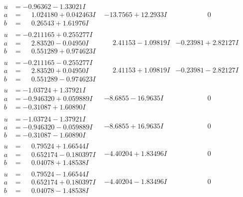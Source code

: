 \documentclass[1p]{elsarticle_modified}
\theoremstyle{definition}
\begin{document}
$$\begin{array}{c|c|c}
\begin{aligned}
u &= -0.96362 - 1.33021 I \\
a &= \phantom{-}1.024180 + 0.042463 I \\
b &= \phantom{-}0.26543 + 1.61976 I\end{aligned}
 & -13.7565 + 12.2933 I & \phantom{-0.000000 } 0 \\ \hline\begin{aligned}
u &= -0.211165 + 0.255277 I \\
a &= \phantom{-}2.83520 - 0.04950 I \\
b &= \phantom{-}0.551289 + 0.974623 I\end{aligned}
 & \phantom{-}2.41153 - 1.09819 I & -0.23981 + 2.82127 I \\ \hline\begin{aligned}
u &= -0.211165 - 0.255277 I \\
a &= \phantom{-}2.83520 + 0.04950 I \\
b &= \phantom{-}0.551289 - 0.974623 I\end{aligned}
 & \phantom{-}2.41153 + 1.09819 I & -0.23981 - 2.82127 I \\ \hline\begin{aligned}
u &= -1.03724 + 1.37921 I \\
a &= -0.946320 + 0.059889 I \\
b &= -0.31087 + 1.60890 I\end{aligned}
 & -8.6855 - 16.9635 I & \phantom{-0.000000 } 0 \\ \hline\begin{aligned}
u &= -1.03724 - 1.37921 I \\
a &= -0.946320 - 0.059889 I \\
b &= -0.31087 - 1.60890 I\end{aligned}
 & -8.6855 + 16.9635 I & \phantom{-0.000000 } 0 \\ \hline\begin{aligned}
u &= \phantom{-}0.79524 + 1.66544 I \\
a &= \phantom{-}0.652174 - 0.180397 I \\
b &= \phantom{-}0.04078 + 1.48538 I\end{aligned}
 & -4.40204 + 1.83496 I & \phantom{-0.000000 } 0 \\ \hline\begin{aligned}
u &= \phantom{-}0.79524 - 1.66544 I \\
a &= \phantom{-}0.652174 + 0.180397 I \\
b &= \phantom{-}0.04078 - 1.48538 I\end{aligned}
 & -4.40204 - 1.83496 I & \phantom{-0.000000 } 0 \\ \hline\begin{aligned}

\end{aligned}
\end{array}$$
\end{document}
